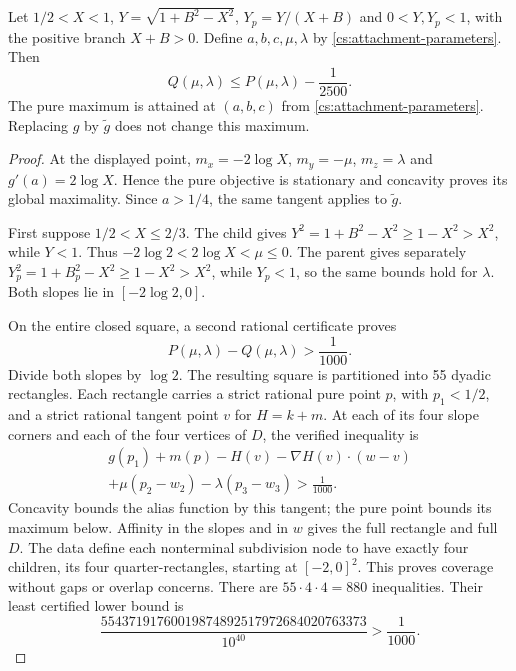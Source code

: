 \begin{lemma}\label{cs:attachment-gap}
Let $1/2<X<1$, $Y=\sqrt{1+B^2-X^2}$, $Y_p=Y/(X+B)$ and $0<Y,Y_p<1$, with the positive branch $X+B>0$. Define $a,b,c,\mu,\lambda$ by \eqref{cs:attachment-parameters}. Then
\[
 Q(\mu,\lambda)\le P(\mu,\lambda)-\frac1{2500}.
\]
The pure maximum is attained at $(a,b,c)$ from \eqref{cs:attachment-parameters}. Replacing $g$ by $\widetilde g$ does not change this maximum.
\end{lemma}

\begin{proof}
At the displayed point,
$m_x=-2\log X$, $m_y=-\mu$, $m_z=\lambda$ and $g'(a)=2\log X$. Hence the pure objective is stationary and concavity proves its global maximality. Since $a>1/4$, the same tangent applies to $\widetilde g$.

First suppose $1/2<X\le2/3$. The child gives
$Y^2=1+B^2-X^2\ge1-X^2>X^2$, while $Y<1$. Thus
$-2\log2<2\log X<\mu\le0$. The parent gives separately
$Y_p^2=1+B_p^2-X^2\ge1-X^2>X^2$, while $Y_p<1$, so the same bounds hold for $\lambda$. Both slopes lie in $[-2\log2,0]$.

On the entire closed square, a second rational certificate proves
\begin{equation}\label{cs:square-gap}
 P(\mu,\lambda)-Q(\mu,\lambda)>\frac1{1000}.
\end{equation}
Divide both slopes by $\log2$. The resulting square is partitioned into 55 dyadic rectangles. Each rectangle carries a strict rational pure point $p$, with $p_1<1/2$, and a strict rational tangent point $v$ for $H=k+m$. At each of its four slope corners and each of the four vertices of $D$, the verified inequality is
\begin{multline}\label{cs:single-certificate}
 g(p_1)+m(p)-H(v)-\nabla H(v)\cdot(w-v)\\
 +\mu(p_2-w_2)-\lambda(p_3-w_3)>\frac1{1000}.
\end{multline}
Concavity bounds the alias function by this tangent; the pure point bounds its maximum below. Affinity in the slopes and in $w$ gives the full rectangle and full $D$. The data define each nonterminal subdivision node to have exactly four children, its four quarter-rectangles, starting at $[-2,0]^2$. This proves coverage without gaps or overlap concerns. There are $55\cdot4\cdot4=880$ inequalities. Their least certified lower bound is
\begin{equation}\label{cs:single-margin}
 \frac{55437191760019874892517972684020763373}{10^{40}}
 >\frac1{1000}.
\end{equation}


\end{proof}
